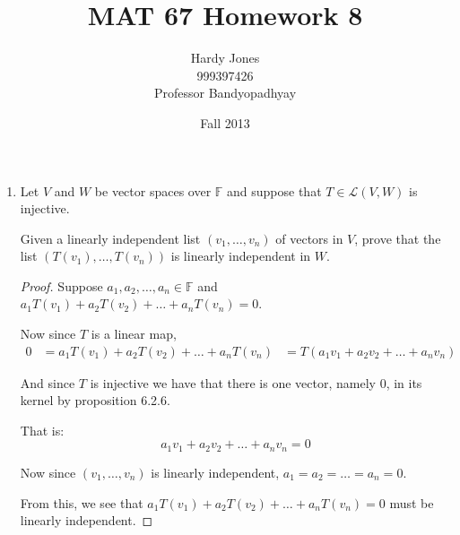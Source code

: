\documentclass[12pt,letterpaper]{article}
\title{MAT 67 Homework 8\vspace{-2ex}}
\author{Hardy Jones\\
        999397426\\
        Professor Bandyopadhyay\vspace{-2ex}}
\date{Fall 2013}
\begin{document}
  \maketitle

  \begin{enumerate}
    \item
      Let $V$ and $W$ be vector spaces over $\mathbb{F}$
      and suppose that $T \in \mathcal{L}(V,W)$ is injective.

      Given a linearly independent list $(v_1, \dots, v_n)$ of vectors in $V$,
      prove that the list $(T(v_1), \dots, T(v_n))$ is linearly independent in $W$.

      \begin{proof}
        Suppose $a_1, a_2, \dots, a_n \in \mathbb{F}$ and
        $a_1T(v_1) + a_2T(v_2) + \dots + a_nT(v_n) = 0$.

        Now since $T$ is a linear map,
        \begin{align*}
          0 &= a_1T(v_1) + a_2T(v_2) + \dots + a_nT(v_n)
          &= T(a_1v_1 + a_2v_2 + \dots + a_nv_n)
        \end{align*}

        And since $T$ is injective we have that there is one vector, namely $0$, in its kernel by proposition 6.2.6.

        That is:
        \[a_1v_1 + a_2v_2 + \dots + a_nv_n = 0\]

        Now since $(v_1, \dots, v_n)$ is linearly independent,
        $a_1 = a_2 = \dots = a_n = 0$.

        From this, we see that $a_1T(v_1) + a_2T(v_2) + \dots + a_nT(v_n) = 0$
        must be linearly independent.
      \end{proof}
  \end{enumerate}
\end{document}
